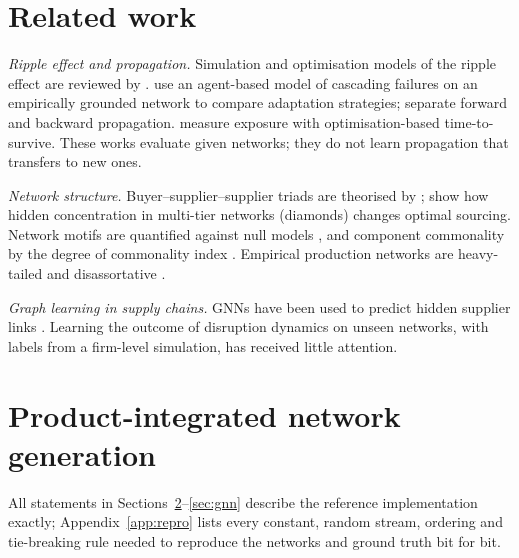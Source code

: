 \documentclass{ifacconf}
\begin{document}
\section{Related work}

\emph{Ripple effect and propagation.} Simulation and optimisation models of the ripple effect are reviewed by \citet{Dolgui2018}. \citet{Zhao2019} use an agent-based model of cascading failures on an empirically grounded network to compare adaptation strategies; \citet{Li2021} separate forward and backward propagation. \citet{SimchiLevi2015} measure exposure with optimisation-based time-to-survive. These works evaluate given networks; they do not learn propagation that transfers to new ones.

\emph{Network structure.} Buyer--supplier--supplier triads are theorised by \citet{ChoiWu2009}; \citet{Ang2017} show how hidden concentration in multi-tier networks (diamonds) changes optimal sourcing. Network motifs are quantified against null models \citep{Milo2002}, and component commonality by the degree of commonality index \citep{Collier1981}. Empirical production networks are heavy-tailed and disassortative \citep{Atalay2011}.

\emph{Graph learning in supply chains.} GNNs have been used to predict hidden supplier links \citep{Kosasih2022}. Learning the outcome of disruption dynamics on unseen networks, with labels from a firm-level simulation, has received little attention.

\section{Product-integrated network generation}
\label{sec:gen}

All statements in Sections~\ref{sec:gen}--\ref{sec:gnn} describe the reference implementation exactly; Appendix~\ref{app:repro} lists every constant, random stream, ordering and tie-breaking rule needed to reproduce the networks and ground truth bit for bit.
\end{document}
